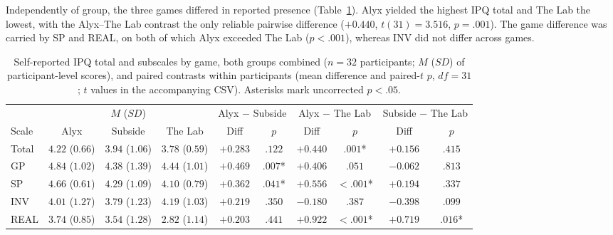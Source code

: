 Independently of group, the three games differed in reported presence (Table~\ref{tab:game}). Alyx yielded the highest IPQ total and The Lab the lowest, with the Alyx--The Lab contrast the only reliable pairwise difference ($+0.440$, $t(31)=3.516$, $p=.001$). The game difference was carried by SP and REAL, on both of which Alyx exceeded The Lab ($p<.001$), whereas INV did not differ across games.

\begin{table}[t]
\centering
\caption{Self-reported IPQ total and subscales by game, both groups combined ($n=32$ participants; $M$ ($SD$) of participant-level scores), and paired contrasts within participants (mean difference and paired-$t$ $p$, $df=31$; $t$ values in the accompanying CSV). Asterisks mark uncorrected $p<.05$.}
\label{tab:game}
\small
\begin{tabular}{lccc cc cc cc}
\hline
 & \multicolumn{3}{c}{$M$ ($SD$)} & \multicolumn{2}{c}{Alyx $-$ Subside} & \multicolumn{2}{c}{Alyx $-$ The Lab} & \multicolumn{2}{c}{Subside $-$ The Lab} \\
Scale & Alyx & Subside & The Lab & Diff & $p$ & Diff & $p$ & Diff & $p$ \\
\hline
Total & $4.22$ ($0.66$) & $3.94$ ($1.06$) & $3.78$ ($0.59$) & $+0.283$ & $.122$ & $+0.440$ & $.001$* & $+0.156$ & $.415$ \\
GP & $4.84$ ($1.02$) & $4.38$ ($1.39$) & $4.44$ ($1.01$) & $+0.469$ & $.007$* & $+0.406$ & $.051$ & $-0.062$ & $.813$ \\
SP & $4.66$ ($0.61$) & $4.29$ ($1.09$) & $4.10$ ($0.79$) & $+0.362$ & $.041$* & $+0.556$ & $<.001$* & $+0.194$ & $.337$ \\
INV & $4.01$ ($1.27$) & $3.79$ ($1.23$) & $4.19$ ($1.03$) & $+0.219$ & $.350$ & $-0.180$ & $.387$ & $-0.398$ & $.099$ \\
REAL & $3.74$ ($0.85$) & $3.54$ ($1.28$) & $2.82$ ($1.14$) & $+0.203$ & $.441$ & $+0.922$ & $<.001$* & $+0.719$ & $.016$* \\
\hline
\end{tabular}
\end{table}

